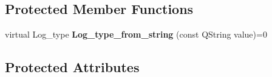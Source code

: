 \subsection*{Protected Member Functions}
\begin{DoxyCompactItemize}
\item 
\hypertarget{class_log__viewer_1_1_log__item_a97a3177b547998c85e497be12c388997}{virtual Log\-\_\-type {\bfseries Log\-\_\-type\-\_\-from\-\_\-string} (const Q\-String value)=0}\label{class_log__viewer_1_1_log__item_a97a3177b547998c85e497be12c388997}

\end{DoxyCompactItemize}
\subsection*{Protected Attributes}
